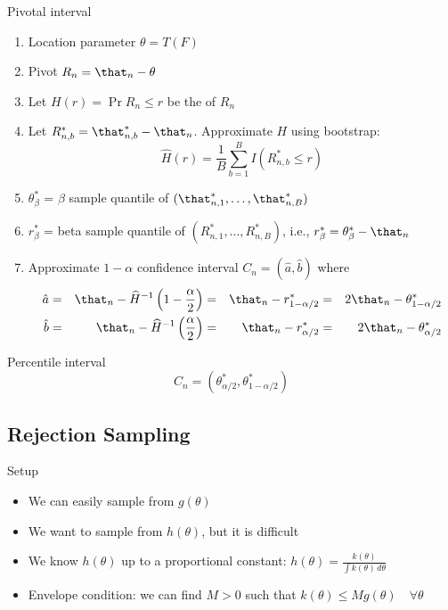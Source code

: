 \documentclass[landscape]{article}
\begin{document}
\begin{multicols*}{2}
Pivotal interval
\begin{enumerate}
  \item Location parameter $\theta = T(F)$
  \item Pivot $R_n = \that_n - \theta$
  \item Let $H(r) = \Pr{R_n \le r}$ be the \cdf of $R_n$
  \item Let $R_{n,b}^* = \that_{n,b}^* - \that_n$.
    Approximate $H$ using bootstrap:
    \[\widehat{H}(r) = \frac{1}{B}\sum_{b=1}^B I(R_{n,b}^* \le r)\]
  \item $\theta_\beta^*$ = $\beta$ sample quantile of
    $(\that_{n,1}^*,\dots,\that_{n,B}^*)$
  \item $r_\beta^*$ = beta sample quantile of
    $(R_{n,1}^*,\dots,R_{n,B}^*)$, i.e.,
    $r_\beta^* = \theta_\beta^* - \that_n$
  \item Approximate $1-\alpha$ confidence interval
    $C_n = \left( \hat{a}, \hat{b} \right)$ where
    \begin{align*}
    \hat{a}
      &=& \that_n - \widehat{H}^{-1}\left( 1-\frac{\alpha}{2} \right)
      &=& \that_n - r_{1-\alpha/2}^*
      &=& 2\that_n - \theta_{1-\alpha/2}^* \\
    \hat{b}
      &=& \that_n - \widehat{H}^{-1}\left( \frac{\alpha}{2} \right)
      &=& \that_n - r_{\alpha/2}^*
      &=& 2\that_n - \theta_{\alpha/2}^*
    \end{align*}
\end{enumerate}

Percentile interval
\[C_n = \left( \theta_{\alpha/2}^*, \theta_{1-\alpha/2}^* \right)\]

\subsection{Rejection Sampling}
Setup
\begin{itemize}
  \item We can easily sample from $g(\theta)$
  \item We want to sample from $h(\theta)$, but it is difficult
  \item We know $h(\theta)$ up to a proportional constant:
    $h(\theta) = \displaystyle\frac{k(\theta)}{\int k(\theta)\,d\theta}$
  \item Envelope condition: we can find $M > 0$ such that
    $k(\theta) \le Mg(\theta) \quad \forall \theta$
\end{itemize}


\end{multicols*}
\end{document}
